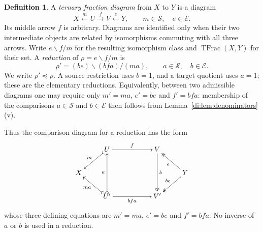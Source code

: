\documentclass[11pt,reqno,a4paper]{amsart}
\theoremstyle{definition}
\newtheorem{definition}[theorem]{Definition}
\theoremstyle{remark}
\newcommand{\0}{\mathbf{0}}
\renewcommand{\1}{\mathbf{1}}
\newcommand{\Sden}{\mathcal S}
\newcommand{\Eden}{\mathcal E}
\DeclareMathOperator{\TFrac}{TFrac}
\begin{document}
\begin{definition}\label{di:def:ternary}
A \emph{ternary fraction diagram} from $X$ to $Y$ is a diagram
\begin{equation}\label{di:eq:ternary}
 X\xleftarrow{m}U\xrightarrow{f}V\xleftarrow{e}Y,
 \qquad m\in\Sden,\quad e\in\Eden.
\end{equation}
Its middle arrow $f$ is arbitrary. Diagrams are identified only when
their two intermediate objects are related by isomorphisms commuting
with all three arrows. Write $e\backslash f/m$ for the resulting
isomorphism class and $\TFrac(X,Y)$ for their set.
A \emph{reduction} of $\rho=e\backslash f/m$ is
\[
 \rho'=(be)\backslash(bfa)/(ma),
 \qquad a\in\Sden,\quad b\in\Eden.
\]
We write $\rho'\preceq\rho$. A source restriction uses $b=1$,
and a target quotient uses $a=1$; these are the elementary reductions.
Equivalently, between two admissible diagrams one may require only
$m'=ma$, $e'=be$ and $f'=bfa$: membership of the comparisons
$a\in\Sden$ and $b\in\Eden$ then follows from
Lemma~\ref{di:lem:denominators}(v).
\end{definition}

Thus the comparison diagram for a reduction has the form
\begin{equation}\label{di:eq:large-reduction}
\vcenter{\xymatrix@C=24pt@R=20pt{
 & U\ar@{>->}[dl]_-{m}\ar[rr]^-{f}
 && V\ar@{->>}[dd]^-{b} & \\
 X &&&& Y\ar@{->>}[ul]^-{e}\ar@{->>}[dl]_-{be} \\
 & U'\ar@{>->}[uu]^-{a}\ar@{>->}[ul]^-{ma}\ar[rr]_-{bfa}
 && V' &
}}
\end{equation}
whose three defining equations are
$m'=ma$, $e'=be$ and $f'=bfa$. No inverse of $a$ or $b$ is used
in a reduction.
\end{document}
